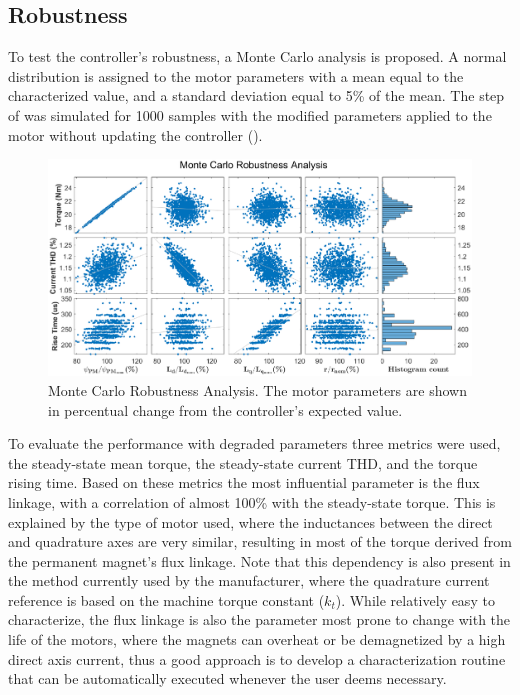 \documentclass[9pt,conference]{IEEEtran}
\begin{document}
\subsection{Robustness}

To test the controller's robustness, a Monte Carlo analysis is proposed. A normal distribution is assigned to the motor parameters with a mean equal to the characterized value, and a standard deviation equal to 5\% of the mean. The step of  was simulated for 1000 samples with the modified parameters applied to the motor without updating the controller ().

    \begin{figure}[!htb]
        \centering
        \includegraphics[width=0.8\linewidth]{Figures/MonteCarlo.eps}
        \caption[Monte Carlo Robustness Analysis.]{Monte Carlo Robustness Analysis. The motor parameters are shown in percentual change from the controller's expected value.}
        \label{fig:montecarlo} %
    \end{figure}

To evaluate the performance with degraded parameters three metrics were used, the steady-state mean torque, the steady-state current THD, and the torque rising time. Based on these metrics the most influential parameter is the flux linkage, with a correlation of almost 100\% with the steady-state torque. This is explained by the type of motor used, where the inductances between the direct and quadrature axes are very similar, resulting in most of the torque derived from the permanent magnet's flux linkage. Note that this dependency is also present in the method currently used by the manufacturer, where the quadrature current reference is based on the machine torque constant ($k_t$). 
While relatively easy to characterize, the flux linkage is also the parameter most prone to change with the life of the motors, where the magnets can overheat or be demagnetized by a high direct axis current, thus a good approach is to develop a characterization routine that can be automatically executed whenever the user deems necessary.
\end{document}
